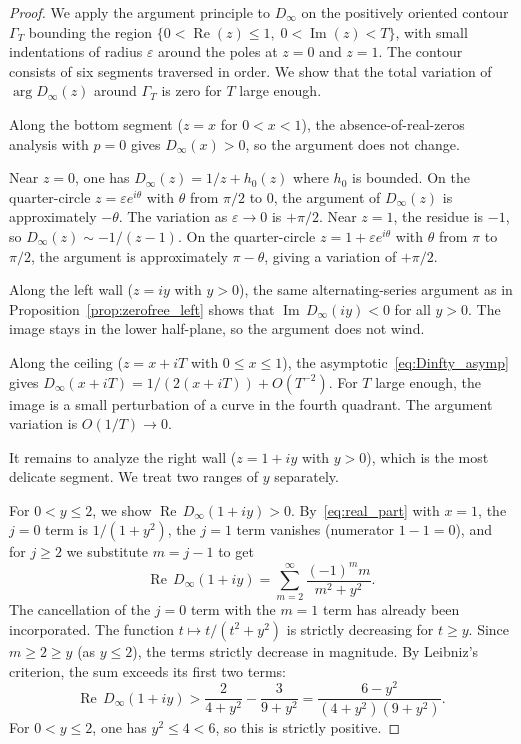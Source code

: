 \documentclass[11pt]{amsart}
\theoremstyle{definition}
\theoremstyle{remark}
\newcommand{\eps}{\varepsilon}
\newcommand{\Real}{\operatorname{Re}}
\newcommand{\Imag}{\operatorname{Im}}
\begin{document}
\begin{proof}
We apply the argument principle to $D_\infty$ on the positively oriented contour $\Gamma_T$ bounding the region $\{0 < \Real(z) \leq 1,\; 0 < \Imag(z) < T\}$, with small indentations of radius $\eps$ around the poles at $z = 0$ and $z = 1$. The contour consists of six segments traversed in order. We show that the total variation of $\arg D_\infty(z)$ around $\Gamma_T$ is zero for $T$ large enough.

Along the bottom segment ($z = x$ for $0 < x < 1$), the absence-of-real-zeros analysis with $p = 0$ gives $D_\infty(x) > 0$, so the argument does not change.

Near $z = 0$, one has $D_\infty(z) = 1/z + h_0(z)$ where $h_0$ is bounded. On the quarter-circle $z = \eps e^{i\theta}$ with $\theta$ from $\pi/2$ to $0$, the argument of $D_\infty(z)$ is approximately $-\theta$. The variation as $\eps \to 0$ is $+\pi/2$. Near $z = 1$, the residue is $-1$, so $D_\infty(z) \sim -1/(z-1)$. On the quarter-circle $z = 1 + \eps e^{i\theta}$ with $\theta$ from $\pi$ to $\pi/2$, the argument is approximately $\pi - \theta$, giving a variation of $+\pi/2$.

Along the left wall ($z = iy$ with $y > 0$), the same alternating-series argument as in Proposition~\ref{prop:zerofree_left} shows that $\Imag\, D_\infty(iy) < 0$ for all $y > 0$. The image stays in the lower half-plane, so the argument does not wind.

Along the ceiling ($z = x + iT$ with $0 \leq x \leq 1$), the asymptotic~\eqref{eq:Dinfty_asymp} gives $D_\infty(x+iT) = 1/(2(x+iT)) + O(T^{-2})$. For $T$ large enough, the image is a small perturbation of a curve in the fourth quadrant. The argument variation is $O(1/T) \to 0$.

It remains to analyze the right wall ($z = 1 + iy$ with $y > 0$), which is the most delicate segment. We treat two ranges of $y$ separately.

For $0 < y \leq 2$, we show $\Real\, D_\infty(1+iy) > 0$. By~\eqref{eq:real_part} with $x = 1$, the $j=0$ term is $1/(1+y^2)$, the $j=1$ term vanishes (numerator $1-1=0$), and for $j \geq 2$ we substitute $m = j-1$ to get
$$
\Real\, D_\infty(1+iy) = \sum_{m=2}^{\infty} \frac{(-1)^m m}{m^2 + y^2}.
$$
The cancellation of the $j=0$ term with the $m=1$ term has already been incorporated. The function $t \mapsto t/(t^2 + y^2)$ is strictly decreasing for $t \geq y$. Since $m \geq 2 \geq y$ (as $y \leq 2$), the terms strictly decrease in magnitude. By Leibniz's criterion, the sum exceeds its first two terms:
$$
\Real\, D_\infty(1+iy) > \frac{2}{4+y^2} - \frac{3}{9+y^2} = \frac{6-y^2}{(4+y^2)(9+y^2)}.
$$
For $0 < y \leq 2$, one has $y^2 \leq 4 < 6$, so this is strictly positive.


\end{proof}
\end{document}
